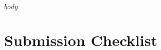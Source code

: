 \documentclass[11pt]{article}
\begin{document}
\maketitle
\begin{abstract}
$abstract$
\end{abstract}
$body$

\newpage
\section*{Submission Checklist}

%
%
%

%
%
%
%
%
%
%
%
\end{document}
